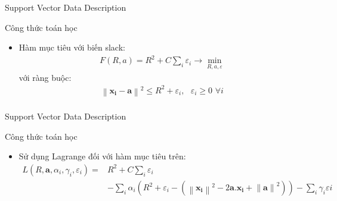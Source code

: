 \documentclass[
	10pt,                %
	aspectratio=169,     %
]{beamer}
\begin{document}
         \begin{frame}{Support Vector Data Description}
        \begin{block}{Công thức toán học}
    	\begin{itemize}
            \item Hàm mục tiêu với biến slack:
                		\begin{equation}\label{svdd3}
                            \begin{align}
                                F(R, a) = R^{2} + C\sum_{i}^{}\varepsilon _{i} \rightarrow  \min_{R, a, \varepsilon }
                            \end{align}
                        \end{equation}
                        với ràng buộc:
                        \begin{equation}\label{svdd4}
                            \begin{align}
                                \left \| \mathbf{x_{i}} -\mathbf{a }\right \|^{2}\leqslant R^{2} + \varepsilon _{i},\, \, \, \,  \varepsilon _{i}\geq 0 \, \, \forall i \\
                            \end{align}
                        \end{equation} 
    	\end{itemize}
        \end{block}
    \end{frame}	
    
             \begin{frame}{Support Vector Data Description}
        \begin{block}{Công thức toán học}
    	\begin{itemize}
            \item Sử dụng Lagrange đối với hàm mục tiêu trên:
            \begin{equation}\label{svdd5}
                \begin{aligned}
                L(R, \mathbf{a}, \alpha _{i}, \gamma _{i}, \varepsilon _{i})= & R^{2} + C\sum_{i}^{}\varepsilon _{i} \\
             & - \sum_{i}^{}\alpha _{i}(R^{2}+\varepsilon _{i}-
            (\left \| \mathbf{x_{i}}\right \|^{2} - 2\mathbf{a.x_{i}} + \left \| \mathbf{a} \right \|^{2})) - \sum_{i}^{}\gamma _{i}\varepsilon i
                \end{aligned}
            \end{equation} 
                		
    	\end{itemize}
        \end{block}
    \end{frame}	
    
\end{document}
